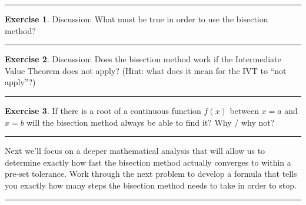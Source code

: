\documentclass[
]{book}
\theoremstyle{definition}
\theoremstyle{definition}
\theoremstyle{definition}
\newtheorem{exercise}{Exercise}[chapter]
\theoremstyle{remark}
\begin{document}
\begin{center}\rule{0.5\linewidth}{0.5pt}\end{center}

\begin{exercise}
\protect\hypertarget{exr:unnamed-chunk-84}{}{\label{exr:unnamed-chunk-84} }Discussion: What must be true in order to use the bisection method?
\end{exercise}

\begin{center}\rule{0.5\linewidth}{0.5pt}\end{center}

\begin{exercise}
\protect\hypertarget{exr:unnamed-chunk-85}{}{\label{exr:unnamed-chunk-85} }Discussion: Does the bisection method work if the Intermediate Value Theorem does not apply? (Hint: what does it mean for the IVT to ``not apply''?)
\end{exercise}

\begin{center}\rule{0.5\linewidth}{0.5pt}\end{center}

\begin{exercise}
\protect\hypertarget{exr:unnamed-chunk-86}{}{\label{exr:unnamed-chunk-86} }If there is a root of a continuous function \(f(x)\) between \(x=a\) and \(x=b\) will the bisection method always be able to find it? Why / why not?
\end{exercise}

\begin{center}\rule{0.5\linewidth}{0.5pt}\end{center}

Next we'll focus on a deeper mathematical analysis that will allow us to determine exactly how fast the bisection method actually converges to within a pre-set tolerance. Work through the next problem to develop a formula that tells you exactly how many steps the bisection method needs to take in order to stop.

\begin{center}\rule{0.5\linewidth}{0.5pt}\end{center}
\end{document}
